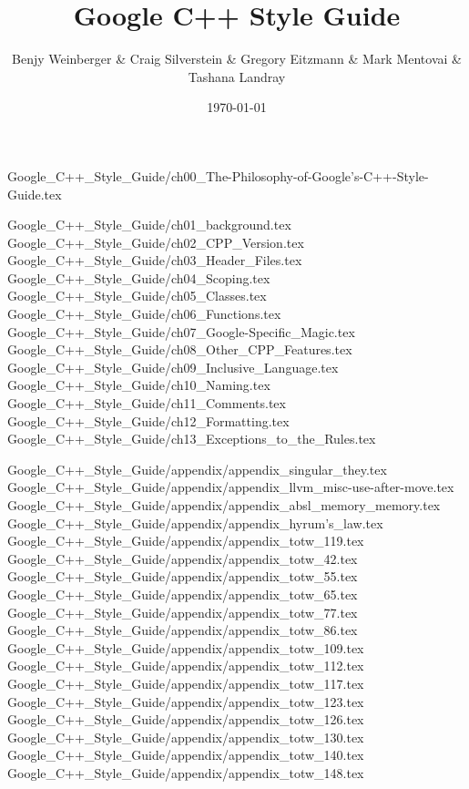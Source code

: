 \documentclass[11pt,titlestyle=display,twoside]{elegantbook}
\title{Google C++ Style Guide}
\author{Benjy Weinberger \& Craig Silverstein \& Gregory Eitzmann \& Mark Mentovai \& Tashana Landray}
\institute{Google}
\date{\today}
\begin{document}
    \maketitle

    \frontmatter
    {Google_C++_Style_Guide/ch00_The-Philosophy-of-Google's-C++-Style-Guide.tex}
    \tableofcontents

    \mainmatter

    {Google_C++_Style_Guide/ch01_background.tex}
    {Google_C++_Style_Guide/ch02_CPP_Version.tex}
    {Google_C++_Style_Guide/ch03_Header_Files.tex}
    {Google_C++_Style_Guide/ch04_Scoping.tex}
    {Google_C++_Style_Guide/ch05_Classes.tex}
    {Google_C++_Style_Guide/ch06_Functions.tex}
    {Google_C++_Style_Guide/ch07_Google-Specific_Magic.tex}
    {Google_C++_Style_Guide/ch08_Other_CPP_Features.tex}
    {Google_C++_Style_Guide/ch09_Inclusive_Language.tex}
    {Google_C++_Style_Guide/ch10_Naming.tex}
    {Google_C++_Style_Guide/ch11_Comments.tex}
    {Google_C++_Style_Guide/ch12_Formatting.tex}
    {Google_C++_Style_Guide/ch13_Exceptions_to_the_Rules.tex}

    \appendix
    {Google_C++_Style_Guide/appendix/appendix_singular_they.tex}
    {Google_C++_Style_Guide/appendix/appendix_llvm_misc-use-after-move.tex}
    {Google_C++_Style_Guide/appendix/appendix_absl_memory_memory.tex}
    {Google_C++_Style_Guide/appendix/appendix_hyrum's_law.tex}
    {Google_C++_Style_Guide/appendix/appendix_totw_119.tex}
    {Google_C++_Style_Guide/appendix/appendix_totw_42.tex}
    {Google_C++_Style_Guide/appendix/appendix_totw_55.tex}
    {Google_C++_Style_Guide/appendix/appendix_totw_65.tex}
    {Google_C++_Style_Guide/appendix/appendix_totw_77.tex}
    {Google_C++_Style_Guide/appendix/appendix_totw_86.tex}
    {Google_C++_Style_Guide/appendix/appendix_totw_109.tex}
    {Google_C++_Style_Guide/appendix/appendix_totw_112.tex}
    {Google_C++_Style_Guide/appendix/appendix_totw_117.tex}
    {Google_C++_Style_Guide/appendix/appendix_totw_123.tex}
    {Google_C++_Style_Guide/appendix/appendix_totw_126.tex}
    {Google_C++_Style_Guide/appendix/appendix_totw_130.tex}
    {Google_C++_Style_Guide/appendix/appendix_totw_140.tex}
    {Google_C++_Style_Guide/appendix/appendix_totw_148.tex}
\end{document}
